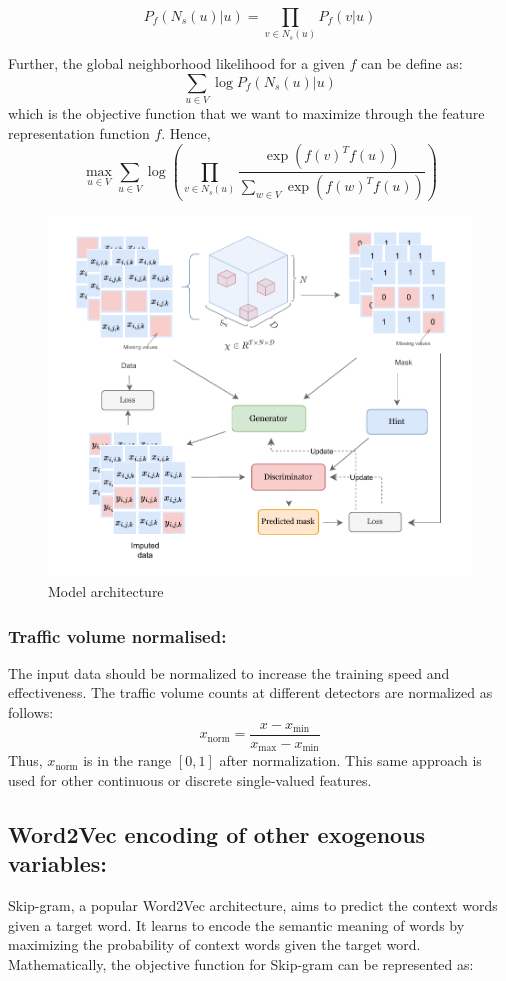 \begin{enumerate}[(i)]
    \[ P_f(N_s(u)|u) = \prod_{v \in N_s(u)} P_f(v|u) \tag{2} \]

    Further, the global neighborhood likelihood for a given \( f \) can be define as:
    \[ \sum_{u \in V} \log P_f(N_s(u)|u) \tag{3}\]
    which is the objective function that we want to maximize through the feature representation function \(f\). Hence,
     \[
    \max_{u \in V} \sum_{u \in V} \log \left( \prod_{v \in N_s(u)} \frac{\exp(f(v)^T f(u))}{\sum_{w \in V} \exp(f(w)^T f(u))} \right) \tag{4}
    \]
\end{enumerate}

\begin{figure}[t]
  \centering
  \includegraphics[width=1\textwidth]{images/model.pdf}
  \caption{Model architecture}
  \label{fig:dataset}
\end{figure}

\subsubsection{Traffic volume normalised:}
The input data should be normalized to increase the training speed and effectiveness. The traffic volume counts at different detectors are normalized as follows:
\[
x_{\text{norm}} = \frac{x - x_{\text{min}}}{x_{\text{max}} - x_{\text{min}}}
\]
Thus, \( x_{\text{norm}} \) is in the range \([0,1]\) after normalization. This same approach is used for other continuous or discrete single-valued features.

\subsection{Word2Vec encoding of other exogenous variables:}
Skip-gram\cite{skipgram}, a popular Word2Vec\cite{word2vec} architecture, aims to predict the context words given a target word. It learns to encode the semantic meaning of words by maximizing the probability of context words given the target word. Mathematically, the objective function for Skip-gram can be represented as:

